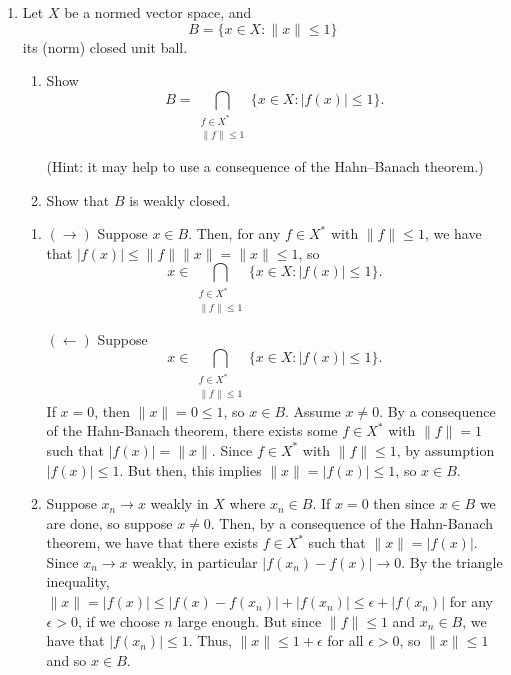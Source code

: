 \documentclass[11pt]{article}
\begin{document}
\begin{enumerate}[label=\arabic*.]
\vspace{1em}

\item Let $X$ be a normed vector space, and
\[
B = \{x \in X : \|x\| \le 1\}
\]
its (norm) closed unit ball.
\begin{enumerate}[label=(\alph*)]
\item Show
\[
B = \bigcap_{\substack{f \in X^* \\ \|f\| \le 1}} \{x \in X : |f(x)| \le 1\}.
\]

(Hint: it may help to use a consequence of the Hahn–Banach theorem.)

\item Show that $B$ is weakly closed.
\end{enumerate}

\vspace{1em}

\begin{enumerate}
    \item $(\rightarrow)$ Suppose $x \in B$. 
        Then, for any $f \in X^{*}$ with $\|f\| \leq 1$, we have that $|f(x)| \leq \|f\|\|x\| = \|x\| \leq 1$, so
        \[
        x \in \bigcap_{\substack{f \in X^{*} \\ \|f\| \leq 1}} \{x \in X : |f(x)| \leq 1\}
        .\] 

        $(\leftarrow)$ Suppose
        \[
        x \in \bigcap_{\substack{f \in X^{*} \\ \|f\| \leq 1}} \{x \in X : |f(x)| \leq 1\}
        .\] 
        If $x = 0$, then $\|x\| = 0 \leq 1$, so $x \in B$. Assume $x \neq 0$.
        By a consequence of the Hahn-Banach theorem, there exists some $f \in X^{*}$ with $\|f\| = 1$ such that $|f(x)| = \|x\|$.
        Since $f \in X^{*}$ with $\|f\| \leq 1$, by assumption $|f(x)| \leq 1$.
        But then, this implies $\|x\| = |f(x)| \leq 1$, so $x \in B$.
    \item Suppose $x_n \to x$ weakly in $X$ where $x_n \in B$. If $x = 0$ then since $x \in B$ we are done, so suppose $x \neq 0$.
        Then, by a consequence of the Hahn-Banach theorem, we have that there exists $f \in X^{*}$ such that $\|x\| = |f(x)|$.
        Since $x_n \to x$ weakly, in particular $|f(x_n) - f(x)| \to 0$.
        By the triangle inequality, $\|x\| = |f(x)| \leq |f(x) - f(x_n)| + |f(x_n)| \leq \epsilon + |f(x_n)|$ for any $\epsilon > 0$, if we choose $n$ large enough.
        But since $\|f\| \leq 1$ and $x_n \in B$, we have that $|f(x_n)| \leq 1$.
        Thus, $\|x\| \leq 1 + \epsilon$ for all $\epsilon > 0$, so $\|x\| \leq 1$ and so $x \in B$.
\end{enumerate}


\end{enumerate}
\end{document}
